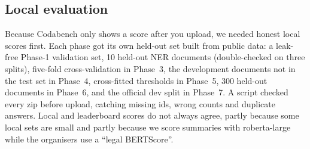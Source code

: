 \documentclass[11pt, oneside]{article}
\begin{document}
\begin{table}[!t]\centering\footnotesize
\caption{Hyperparameters of the final model of each phase (P5--P7: the best single Phase-1 model).
$^*$R2, after 3,000 steps of R1.}\label{tab:hparams}
\end{table}

\subsection{Local evaluation}\label{sec:localeval}
Because Codabench only shows a score after you upload, we needed honest local scores first.  Each phase got
its own held-out set built from public data: a leak-free Phase-1 validation set, 10 held-out NER documents
(double-checked on three splits), five-fold cross-validation in Phase~3, the development documents not in the
test set in Phase~4, cross-fitted thresholds in Phase~5, 300 held-out documents in Phase~6, and the official
dev split in Phase~7.  A script checked every zip before upload, catching missing ids, wrong counts and
duplicate answers.  Local and leaderboard scores do not always agree, partly because some local sets are small
and partly because we score summaries with roberta-large while the organisers use a ``legal BERTScore''.
\end{document}
